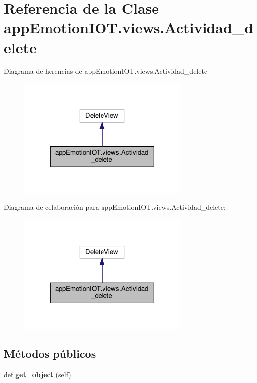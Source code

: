 \hypertarget{classappEmotionIOT_1_1views_1_1Actividad__delete}{}\section{Referencia de la Clase app\+Emotion\+I\+O\+T.\+views.\+Actividad\+\_\+delete}
\label{classappEmotionIOT_1_1views_1_1Actividad__delete}


Diagrama de herencias de app\+Emotion\+I\+O\+T.\+views.\+Actividad\+\_\+delete
\nopagebreak
\begin{figure}[H]
\begin{center}
\leavevmode
\includegraphics[width=237pt]{classappEmotionIOT_1_1views_1_1Actividad__delete__inherit__graph}
\end{center}
\end{figure}


Diagrama de colaboración para app\+Emotion\+I\+O\+T.\+views.\+Actividad\+\_\+delete\+:
\nopagebreak
\begin{figure}[H]
\begin{center}
\leavevmode
\includegraphics[width=237pt]{classappEmotionIOT_1_1views_1_1Actividad__delete__coll__graph}
\end{center}
\end{figure}
\subsection*{Métodos públicos}
\begin{DoxyCompactItemize}
\item 
def {\bfseries get\+\_\+object} (self)\hypertarget{classappEmotionIOT_1_1views_1_1Actividad__delete_a0749e4620b72f6eabcee1fe3731dfa29}{}\label{classappEmotionIOT_1_1views_1_1Actividad__delete_a0749e4620b72f6eabcee1fe3731dfa29}

\end{DoxyCompactItemize}
